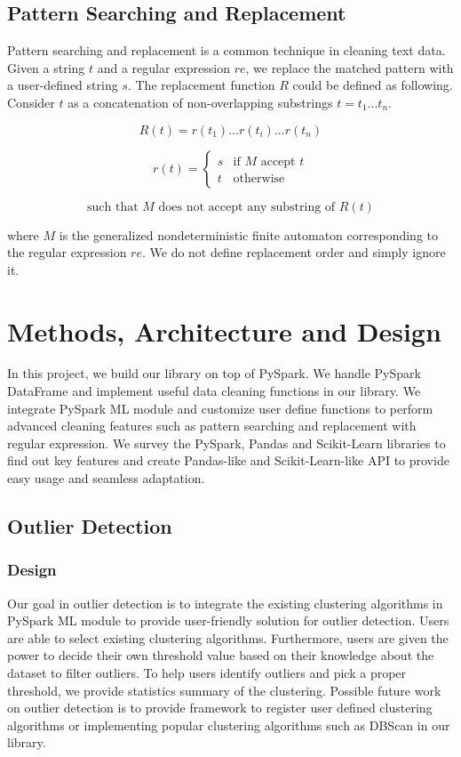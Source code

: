 \documentclass[sigconf]{acmart}
\begin{document}
\subsection{Pattern Searching and Replacement}
Pattern searching and replacement is a common technique in cleaning text data. Given a string $t$ and a regular expression\cite{theory_com} $re$, we replace the matched pattern with a user-defined string $s$. The replacement function $R$ could be defined as following.
Consider $t$ as a concatenation of non-overlapping substrings $t = t_1...t_n$.

\[ R(t) =  r(t_1)...r(t_i)...r(t_n)\]

\[r(t) = \begin{cases} s & \text{if $M$ accept $t$} \\ t & \text{otherwise} \end{cases}\]

\[\text{such that $M$ does not accept any substring of } R(t)\]

where $M$ is the generalized nondeterministic finite automaton\cite{theory_com} corresponding to the regular expression $re$. We do not define replacement order and simply ignore it.


\section{Methods, Architecture and Design}
In this project, we build our library on top of PySpark. We handle PySpark DataFrame and implement useful data cleaning functions in our library. We integrate PySpark ML module and customize user define functions to perform advanced cleaning features such as pattern searching and replacement with regular expression. We survey the PySpark\cite{pyspark}, Pandas\cite{pandas} and Scikit-Learn\cite{scikit-learn} libraries to find out key features and create Pandas-like and Scikit-Learn-like API to provide easy usage and seamless adaptation.

\subsection{Outlier Detection}
\subsubsection{Design} 
Our goal in outlier detection is to integrate the existing clustering algorithms in PySpark ML module to provide user-friendly solution for outlier detection. Users are able to select existing clustering algorithms. Furthermore, users are given the power to decide their own threshold value based on their knowledge about the dataset to filter outliers. To help users identify outliers and pick a proper threshold, we provide statistics summary of the clustering. Possible future work on outlier detection is to provide framework to register user defined clustering algorithms or implementing popular clustering algorithms such as DBScan\cite{DBScan} in our library.
\end{document}
